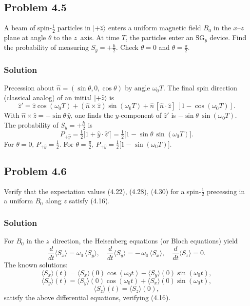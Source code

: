 \documentclass[twocolumn]{article}
\begin{document}
\begin{spacing}{1}
\subsection{Problem 4.5}
A beam of spin-$\tfrac12$ particles in $|+\hat{z}\rangle$ enters a uniform magnetic field $B_0$ in the $x$--$z$ plane at angle $\theta$ to the $z$~axis. At time $T$, the particles enter an SG$_y$ device. Find the probability of measuring $S_y = +\tfrac{\hbar}{2}$. Check $\theta=0$ and $\theta=\tfrac{\pi}{2}$.

\subsubsection*{Solution}
Precession about $\hat{n} = (\sin\theta,0,\cos\theta)$ by angle $\omega_0 T$. The final spin direction (classical analog) of an initial $|+\hat{z}\rangle$ is
\[
\hat{z}' = \hat{z}\cos(\omega_0 T)
+ (\hat{n}\times \hat{z})\sin(\omega_0 T)
+ \hat{n}\,[\hat{n}\cdot \hat{z}]\,[1-\cos(\omega_0 T)].
\]
With $\hat{n}\times\hat{z} = -\sin\theta\,\hat{y}$, one finds the $y$-component of $\hat{z}'$ is $-\sin\theta\,\sin(\omega_0 T)$. The probability of $S_y=+\tfrac{\hbar}{2}$ is
\[
P_{+\hat{y}} = \tfrac12 \bigl[1 + \hat{y}\cdot\hat{z}'\bigr]
= \tfrac12 \bigl[1 - \sin\theta\,\sin(\omega_0 T)\bigr].
\]
For $\theta=0$, $P_{+\hat{y}}=\tfrac12$. For $\theta=\tfrac{\pi}{2}$,
$P_{+\hat{y}} = \tfrac12 \bigl[1 - \sin(\omega_0 T)\bigr]$.

\subsection{Problem 4.6}
Verify that the expectation values (4.22), (4.28), (4.30) for a spin-$\tfrac12$ precessing in a uniform $B_0$ along $z$ satisfy (4.16).

\subsubsection*{Solution}
For $B_0$ in the $z$~direction, the Heisenberg equations (or Bloch equations) yield
\[
\frac{d}{dt}\langle S_x\rangle = \omega_0\,\langle S_y\rangle, \quad
\frac{d}{dt}\langle S_y\rangle = -\,\omega_0\,\langle S_x\rangle, \quad
\frac{d}{dt}\langle S_z\rangle = 0.
\]
The known solutions:
\[
\langle S_x\rangle(t) = \langle S_x\rangle(0)\cos(\omega_0 t)
- \langle S_y\rangle(0)\sin(\omega_0 t),
\]
\[
\langle S_y\rangle(t) = \langle S_y\rangle(0)\cos(\omega_0 t)
+ \langle S_x\rangle(0)\sin(\omega_0 t),
\]
\[
\langle S_z\rangle(t) = \langle S_z\rangle(0),
\]
satisfy the above differential equations, verifying (4.16).


\end{spacing}
\end{document}
